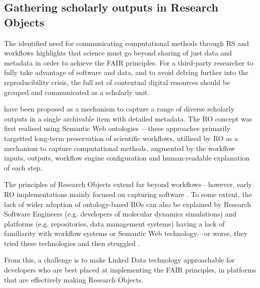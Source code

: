 \subsection{Gathering scholarly outputs in Research Objects}

The identified need for communicating computational methods through \acrlong{RS} and workflows highlights that science must go beyond sharing of just data and metadata in order to achieve the FAIR principles. For a third-party researcher to fully take advantage of software and data, and to avoid delving further into the reproducibility crisis, the full set of contextual digital resources should be grouped and communicated as a scholarly unit.

 \cite{Bechhofer 2013} have been proposed as a mechanism to capture a range of diverse scholarly outputs in a single archivable item with detailed metadata. The RO concept was first realised using Semantic Web ontologies \cite{myExperiment 2009,Belhajjame 2015}---these approaches primarily targetted long-term preservation of \glspl{scientific workflow}, utillised by RO as a mechanism to capture computational methods, augmented by the workflow inputs, outputs,  workflow engine configuration and human-readable explanation of each step.

The principles of Research Objects extend far beyond workflows---however, early RO implementations mainly focused on capturing software \cite{Goble 2018}. To some extent, the lack of wider adoption of ontology-based ROs can also be explained by Research Software Engineers (e.g. developers of molecular dynamics simulations) and platforms (e.g. repositories, data management systems) having a lack of familiarity with workflow systems or Semantic Web technology---or worse, they tried these technologies and then struggled \cite{Carriero 2010,Tudorache 2020}.

From this, a challenge is to make Linked Data technology approachable for developers who are best placed at implementing the FAIR principles, in platforms that are effectively making Research Objects.

